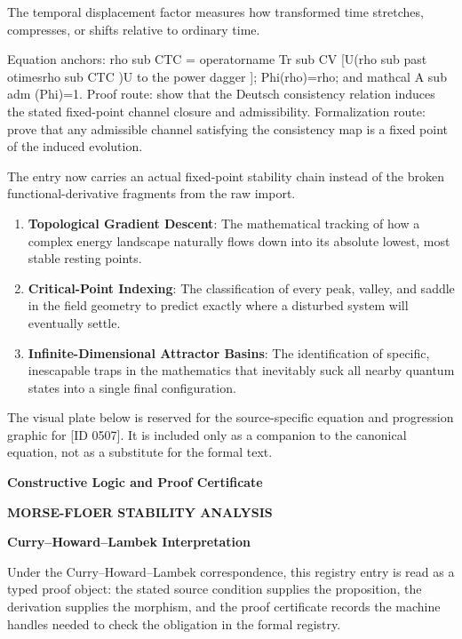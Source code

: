 The temporal displacement factor measures how transformed time stretches, compresses, or shifts relative to ordinary time.

Equation anchors: rho sub CTC = operatorname Tr sub CV [U(rho sub past otimesrho sub CTC )U to the power dagger ]; Phi(rho)=rho; and mathcal A sub adm (Phi)=1. Proof route: show that the Deutsch consistency relation induces the stated fixed-point channel closure and admissibility. Formalization route: prove that any admissible channel satisfying the consistency map is a fixed point of the induced evolution.

The entry now carries an actual fixed-point stability chain instead of the broken functional-derivative fragments from the raw import.
\endgroup

\begin{enumerate}[leftmargin=1.6em,itemsep=6pt,topsep=4pt]
\item \textbf{Topological Gradient Descent}: The mathematical tracking of how a complex energy landscape naturally flows down into its absolute lowest, most stable resting points.
\item \textbf{Critical-Point Indexing}: The classification of every peak, valley, and saddle in the field geometry to predict exactly where a disturbed system will eventually settle.
\item \textbf{Infinite-Dimensional Attractor Basins}: The identification of specific, inescapable traps in the mathematics that inevitably suck all nearby quantum states into a single final configuration.
\end{enumerate}

\begingroup\footnotesize\sloppy
The visual plate below is reserved for the source-specific equation and progression graphic for [ID 0507]. It is included only as a companion to the canonical equation, not as a substitute for the formal text.
\par\endgroup
\ifTZPDarkEdition
{}
\fi

\clearpage
\begingroup\tzpsupportsetup
\noindent\textbf{\fontsize{10.8pt}{12.8pt}\selectfont [ID 0507] Constructive Logic and Proof Certificate}\par
\noindent\textbf{\fontsize{10pt}{12pt}\selectfont MORSE-FLOER STABILITY ANALYSIS}\par
\vspace{0.45em}
\begingroup
\footnotesize
\setlength{\parskip}{0.22em}
\setlength{\parindent}{0pt}
\noindent\textbf{Curry--Howard--Lambek Interpretation}\par
Under the Curry--Howard--Lambek correspondence, this registry entry is read as a typed proof
object: the stated source condition supplies the proposition, the derivation supplies the
morphism, and the proof certificate records the machine handles needed to check the obligation
in the formal registry.

